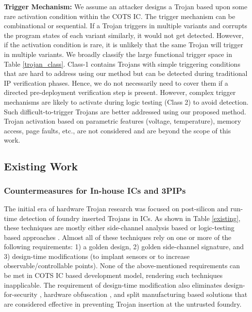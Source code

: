 \documentclass[conference]{IEEEtran}
\begin{document}
\textbf{Trigger Mechanism:}
We assume an attacker designs a Trojan based upon some rare activation condition within the COTS IC. 
The trigger mechanism can be combinational or sequential. %
If a Trojan triggers in multiple variants and corrupts the program states of each variant similarly, it would not get detected. However, if the activation condition is rare, it is unlikely that the same Trojan will trigger in multiple variants.
We broadly classify the large functional trigger space in Table \ref{trojan_class}. Class-1 contains Trojans with simple triggering conditions that are hard to address using our method but can be detected during traditional IP verification phases. Hence, we do not necessarily need to cover them if a directed pre-deployment verification step is present. However, complex trigger mechanisms are likely to activate during logic testing (Class 2) to avoid detection. Such difficult-to-trigger Trojans are better addressed using our proposed method. Trojan activation based on parametric features (voltage, temperature), memory access, page faults, etc., are not considered and are beyond the scope of this work. 



\subsection{Existing Work}


\subsubsection{Countermeasures for In-house ICs and 3PIPs}
The initial era of hardware Trojan research was focused on post-silicon and run-time detection of foundry inserted Trojans in ICs. As shown in Table \ref{existing}, these techniques are mostly either side-channel analysis based \cite{hoque2017golden, rad2008sensitivity, jin2008hardware, soll2014based, forte2013temperature} or logic-testing based approaches \cite{chakraborty2009mero, banga2008region}. Almost all of these techniques rely on one or more of the following requirements: 1) a golden design, 2) golden side-channel signature, and 3) design-time modifications (to implant sensors or to increase observable/controllable points). None of the above-mentioned requirements can be met in COTS IC based development model, rendering such techniques inapplicable. The requirement of design-time modification also eliminates design-for-security \cite{cao2014cluster, jin2012post, xiao2015efficient}, hardware obfuscation \cite{chakraborty2009security, dupuis2014novel, yasin2015transforming}, and split manufacturing \cite{vaidyanathan2014efficient, imeson2013securing} based solutions that are considered effective in preventing Trojan insertion at the untrusted foundry.  
\end{document}
